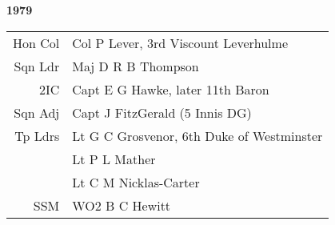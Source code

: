 \begin{center}
  \Huge
  \textbf{1979}
\end{center}

\begin{center}
  \small
  \begin{tabular}{rl}
    Hon Col & Col P Lever, 3rd Viscount Leverhulme \\
    Sqn Ldr & Maj D R B Thompson \\
    2IC & Capt E G Hawke, later 11th Baron \\
    Sqn Adj & Capt J FitzGerald (5 Innis DG) \\
    Tp Ldrs & Lt G C Grosvenor, 6th Duke of Westminster \\
      & Lt P L Mather \\
      & Lt C M Nicklas-Carter \\
    SSM & WO2 B C Hewitt \\
  \end{tabular}
\end{center}

